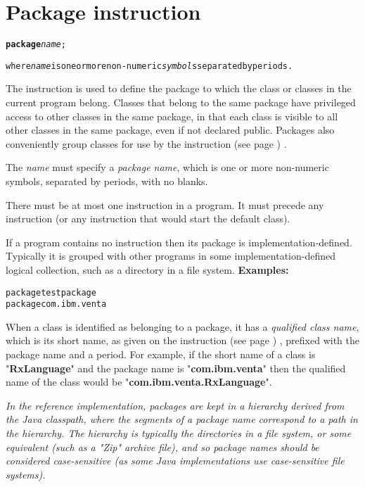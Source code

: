 \chapter{Package instruction}\label{refpackage}
\begin{shaded}
\begin{alltt}
\textbf{package} \emph{name};

where \emph{name} is one or more non-numeric \emph{symbol}s separated by periods.
\end{alltt}
\end{shaded}
 
The  instruction is used to define the package to which
the class or classes in the current program belong.
 Classes that belong to the same package have privileged access to
other classes in the same package, in that each class is visible to all
other classes in the same package, even if not declared public.
Packages also conveniently group classes for use by the
  instruction (see page \pageref{refimport}) .
 
The \emph{name} must specify a \emph{package name}, which is one
or more non-numeric symbols, separated by periods, with no
blanks.
 
There must be at most one  instruction in a program.
It must precede any  instruction (or any instruction that
would start the default class).
 
If a program contains no  instruction then its package
is implementation-defined.  Typically it is grouped with other programs
in some implementation-defined logical collection, such as a directory
in a file system.
 \textbf{Examples:}
\begin{alltt}
package testpackage
package com.ibm.venta
\end{alltt}
 
When a class is identified as belonging to a package, it has a
\emph{qualified class name}, which is its short name, as given on the
  instruction (see page \pageref{refclass}) , prefixed with the package
name and a period.
For example, if the short name of a class is
"\textbf{RxLanguage}" and the package name is
"\textbf{com.ibm.venta}" then the qualified name of the class
would be "\textbf{com.ibm.venta.RxLanguage}".
 
\emph{In the reference implementation, packages are kept in a hierarchy
derived from the Java classpath, where the segments of a package name
correspond to a path in the hierarchy.
The hierarchy is typically the directories in a file system, or some
equivalent (such as a "Zip" archive file), and so package names
should be considered case-sensitive (as some Java implementations use
case-sensitive file systems).
}
